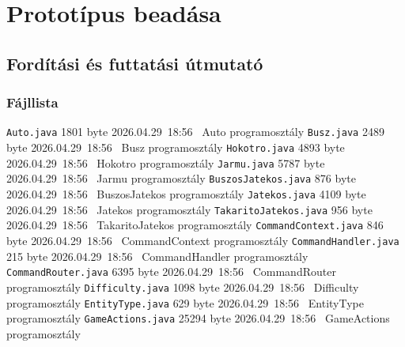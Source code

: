 \chapter{Prototípus beadása}

\section{Fordítási és futtatási útmutató}
\subsection{Fájllista}

\begin{fajllista}
    \fajl
    {\texttt{Auto.java}} %
    {1801 byte} %
    {2026.04.29~18:56~} %
    {Auto programosztály} %
    \fajl
    {\texttt{Busz.java}} %
    {2489 byte} %
    {2026.04.29~18:56~} %
    {Busz programosztály} %
    \fajl
    {\texttt{Hokotro.java}} %
    {4893 byte} %
    {2026.04.29~18:56~} %
    {Hokotro programosztály} %
    \fajl
    {\texttt{Jarmu.java}} %
    {5787 byte} %
    {2026.04.29~18:56~} %
    {Jarmu programosztály} %
    \fajl
    {\texttt{BuszosJatekos.java}} %
    {876 byte} %
    {2026.04.29~18:56~} %
    {BuszosJatekos programosztály} %
    \fajl
    {\texttt{Jatekos.java}} %
    {4109 byte} %
    {2026.04.29~18:56~} %
    {Jatekos programosztály} %
    \fajl
    {\texttt{TakaritoJatekos.java}} %
    {956 byte} %
    {2026.04.29~18:56~} %
    {TakaritoJatekos programosztály} %
    \fajl
    {\texttt{CommandContext.java}} %
    {846 byte} %
    {2026.04.29~18:56~} %
    {CommandContext programosztály} %
    \fajl
    {\texttt{CommandHandler.java}} %
    {215 byte} %
    {2026.04.29~18:56~} %
    {CommandHandler programosztály} %
    \fajl
    {\texttt{CommandRouter.java}} %
    {6395 byte} %
    {2026.04.29~18:56~} %
    {CommandRouter programosztály} %
    \fajl
    {\texttt{Difficulty.java}} %
    {1098 byte} %
    {2026.04.29~18:56~} %
    {Difficulty programosztály} %
    \fajl
    {\texttt{EntityType.java}} %
    {629 byte} %
    {2026.04.29~18:56~} %
    {EntityType programosztály} %
    \fajl
    {\texttt{GameActions.java}} %
    {25294 byte} %
    {2026.04.29~18:56~} %
    {GameActions programosztály} %

\end{fajllista}
